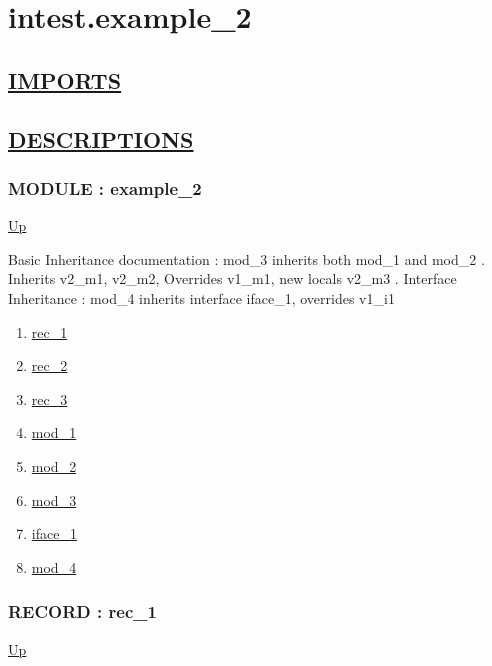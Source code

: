 \chapter*{intest.example\_2}
\hypertarget{ecldoc:toc:intest.example_2}{}

\section*{\underline{IMPORTS}}

\section*{\underline{DESCRIPTIONS}}
\subsection*{MODULE : example\_2}
\hypertarget{ecldoc:intest.example_2}{}
\par
\begin{minipage}[t]{\textwidth}
\begin{flushleft}
  
\end{flushleft}
\end{minipage}
\hyperlink{ecldoc:toc:intest}{Up} \\
\par
Basic Inheritance documentation : mod\_3 inherits both mod\_1 and mod\_2 . Inherits v2\_m1, v2\_m2, Overrides v1\_m1, new locals v2\_m3 . Interface Inheritance : mod\_4 inherits interface iface\_1, overrides v1\_i1 \\
\par
\begin{enumerate}
\item \hyperlink{ecldoc:intest.example_2.rec_1}{rec\_1}
\item \hyperlink{ecldoc:intest.example_2.rec_2}{rec\_2}
\item \hyperlink{ecldoc:intest.example_2.rec_3}{rec\_3}
\item \hyperlink{ecldoc:intest.example_2.mod_1}{mod\_1}
\item \hyperlink{ecldoc:intest.example_2.mod_2}{mod\_2}
\item \hyperlink{ecldoc:intest.example_2.mod_3}{mod\_3}
\item \hyperlink{ecldoc:intest.example_2.iface_1}{iface\_1}
\item \hyperlink{ecldoc:intest.example_2.mod_4}{mod\_4}
\end{enumerate}
\subsection*{RECORD : rec\_1}
\hypertarget{ecldoc:intest.example_2.rec_1}{}
\par
\begin{minipage}[t]{\textwidth}
\begin{flushleft}
  
\end{flushleft}
\end{minipage}
\hyperlink{ecldoc:intest.example_2}{Up} \\
\par
\par
